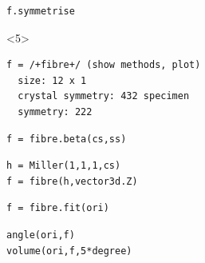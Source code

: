 \documentclass[compress]{beamer}
\begin{document}
\begin{frame}[fragile]
\begin{columns}
\begin{column}{7cm}
\begin{overlayarea}{\textwidth}{8cm}
\begin{lstlisting}[style=input]
f.symmetrise
\end{lstlisting}
\begin{onlyenv}<5>
  \vspace{-0.3cm}
\begin{lstlisting}[style=output]
f = /+fibre+/ (show methods, plot)
  size: 12 x 1
  crystal symmetry: 432 specimen
  symmetry: 222
\end{lstlisting}
\end{onlyenv}

\pause

\vspace{-0.2cm}
\begin{lstlisting}[style=input]
f = fibre.beta(cs,ss)
\end{lstlisting}

\pause

\vspace{-0.2cm}
\begin{lstlisting}[style=input]
h = Miller(1,1,1,cs)
f = fibre(h,vector3d.Z)
\end{lstlisting}

\pause

\vspace{-0.2cm}
\begin{lstlisting}[style=input]
f = fibre.fit(ori)
\end{lstlisting}

\pause

\vspace{-0.2cm}
\begin{lstlisting}[style=input]
angle(ori,f)
volume(ori,f,5*degree)
\end{lstlisting}



\end{overlayarea}
\end{column}



\end{columns}
\end{frame}
\end{document}
